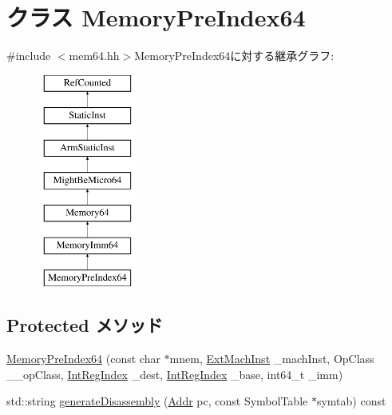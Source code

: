 \hypertarget{classArmISA_1_1MemoryPreIndex64}{
\section{クラス MemoryPreIndex64}
\label{classArmISA_1_1MemoryPreIndex64}
}


{\ttfamily \#include $<$mem64.hh$>$}MemoryPreIndex64に対する継承グラフ:\begin{figure}[H]
\begin{center}
\leavevmode
\includegraphics[height=7cm]{classArmISA_1_1MemoryPreIndex64}
\end{center}
\end{figure}
\subsection*{Protected メソッド}
\begin{DoxyCompactItemize}
\item 
\hyperlink{classArmISA_1_1MemoryPreIndex64_a24b57e9206d5af0674cabdba46feba58}{MemoryPreIndex64} (const char $\ast$mnem, \hyperlink{classStaticInst_a5605d4fc727eae9e595325c90c0ec108}{ExtMachInst} \_\-machInst, OpClass \_\-\_\-opClass, \hyperlink{namespaceArmISA_ae64680ba9fb526106829d6bf92fc791b}{IntRegIndex} \_\-dest, \hyperlink{namespaceArmISA_ae64680ba9fb526106829d6bf92fc791b}{IntRegIndex} \_\-base, int64\_\-t \_\-imm)
\item 
std::string \hyperlink{classArmISA_1_1MemoryPreIndex64_a95d323a22a5f07e14d6b4c9385a91896}{generateDisassembly} (\hyperlink{classm5_1_1params_1_1Addr}{Addr} pc, const SymbolTable $\ast$symtab) const 
\end{DoxyCompactItemize}


